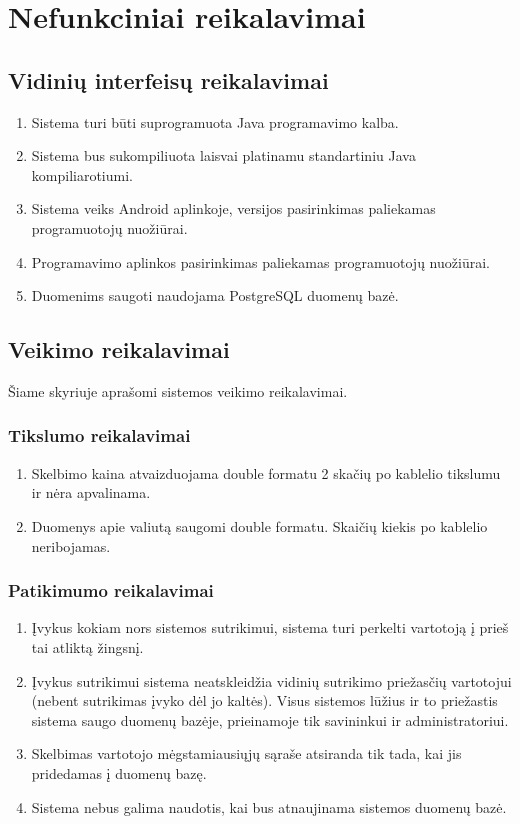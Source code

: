 \documentclass[12pt]{article}
\begin{document}
	\section*{Nefunkciniai reikalavimai}
	\setcounter{subsection}{0}
	
	\subsection{Vidinių interfeisų reikalavimai}
	\begin{enumerate}
		\item Sistema turi būti suprogramuota Java programavimo kalba.
		\item Sistema bus sukompiliuota laisvai platinamu standartiniu Java kompiliarotiumi.
		\item Sistema veiks Android aplinkoje, versijos pasirinkimas paliekamas programuotojų nuožiūrai.
		\item Programavimo aplinkos pasirinkimas paliekamas programuotojų nuožiūrai.
		\item Duomenims saugoti naudojama PostgreSQL duomenų bazė.
	\end{enumerate}	
	
	\subsection{Veikimo reikalavimai}
	Šiame skyriuje aprašomi sistemos veikimo reikalavimai.
	
	\subsubsection{Tikslumo reikalavimai}
	\begin{enumerate}
		\item Skelbimo kaina atvaizduojama double formatu 2 skačių po kablelio tikslumu ir nėra apvalinama.
		\item Duomenys apie valiutą saugomi double formatu. Skaičių kiekis po kablelio neribojamas.
	\end{enumerate}	
	
	\subsubsection{Patikimumo reikalavimai}
	\begin{enumerate}
		\item Įvykus kokiam nors sistemos sutrikimui, sistema turi perkelti vartotoją į prieš tai atliktą žingsnį.
		\item Įvykus sutrikimui sistema neatskleidžia vidinių sutrikimo priežasčių vartotojui (nebent sutrikimas įvyko dėl jo kaltės). Visus sistemos lūžius ir to priežastis sistema saugo duomenų bazėje, prieinamoje tik savininkui ir administratoriui.
		\item Skelbimas vartotojo mėgstamiausiųjų sąraše atsiranda tik tada, kai jis pridedamas į duomenų bazę.
		\item Sistema nebus galima naudotis, kai bus atnaujinama sistemos duomenų bazė.
	\end{enumerate}	
	
\end{document}
